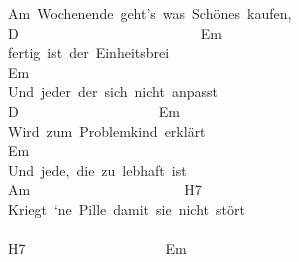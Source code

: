 \documentclass[]{book}
\begin{document}
Am~Wochenende~geht's~was~Schönes~kaufen,~\\
D~~~~~~~~~~~~~~~~~~~~~~~~~~Em\\
fertig~ist~der~Einheitsbrei\\
\hspace*{0.333em}\hspace*{0.333em}\hspace*{0.333em}\hspace*{0.333em}\hspace*{0.333em}Em\\
Und~jeder~der~sich~nicht~anpasst\\
\hspace*{0.333em}\hspace*{0.333em}\hspace*{0.333em}\hspace*{0.333em}\hspace*{0.333em}D~~~~~~~~~~~~~~~~~~~~Em\\
Wird~zum~Problemkind~erklärt\\
\hspace*{0.333em}\hspace*{0.333em}\hspace*{0.333em}\hspace*{0.333em}Em\\
Und~jede,~die~zu~lebhaft~ist\\
\hspace*{0.333em}\hspace*{0.333em}\hspace*{0.333em}\hspace*{0.333em}\hspace*{0.333em}\hspace*{0.333em}\hspace*{0.333em}\hspace*{0.333em}\hspace*{0.333em}\hspace*{0.333em}\hspace*{0.333em}Am~~~~~~~~~~~~~~~~~~~~~~H7\\
Kriegt~`ne~Pille~damit~sie~nicht~stört\\
~\\
\hspace*{0.333em}\hspace*{0.333em}\hspace*{0.333em}\hspace*{0.333em}\hspace*{0.333em}\hspace*{0.333em}H7~~~~~~~~~~~~~~~~~~~~Em~\\
\end{document}
